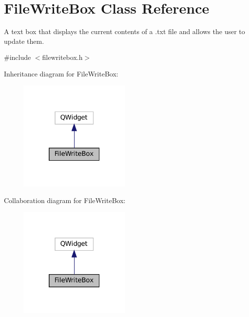 \hypertarget{classFileWriteBox}{}\section{File\+Write\+Box Class Reference}
\label{classFileWriteBox}


A text box that displays the current contents of a .txt file and allows the user to update them.  




{\ttfamily \#include $<$filewritebox.\+h$>$}



Inheritance diagram for File\+Write\+Box\+:\nopagebreak
\begin{figure}[H]
\begin{center}
\leavevmode
\includegraphics[width=157pt]{classFileWriteBox__inherit__graph}
\end{center}
\end{figure}


Collaboration diagram for File\+Write\+Box\+:\nopagebreak
\begin{figure}[H]
\begin{center}
\leavevmode
\includegraphics[width=157pt]{classFileWriteBox__coll__graph}
\end{center}
\end{figure}
